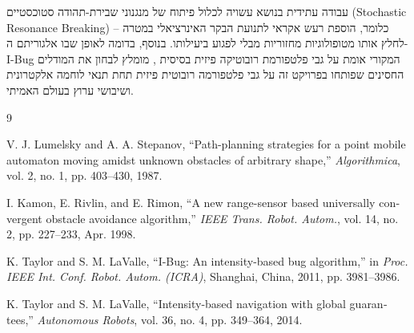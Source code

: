 \documentclass[12pt, a4paper]{article}
\begin{document}
עבודה עתידית בנושא עשויה לכלול פיתוח של מנגנוני שבירת-תהודה סטוכסטיים (\textenglish{Stochastic Resonance Breaking}) – כלומר, הוספת רעש אקראי לתנועת הבקר האינרציאלי במטרה לחלץ אותו מטופולוגיות מחזוריות מבלי לפגוע ביעילותו. בנוסף, בדומה לאופן שבו אלגוריתם ה-\textenglish{I-Bug} המקורי אומת על גבי פלטפורמת רובוטיקה פיזית בסיסית \cite{taylor2014intensity}, מומלץ לבחון את המודלים החסינים שפותחו בפרויקט זה על גבי פלטפורמה רובוטית פיזית תחת תנאי לוחמה אלקטרונית ושיבושי ערוץ בעולם האמיתי.
\newpage
\renewcommand{\refname}{רשימת מקורות}
\begin{thebibliography}{9}

\textenglish{V. J. Lumelsky and A. A. Stepanov, ``Path-planning strategies for a point mobile automaton moving amidst unknown obstacles of arbitrary shape,'' \textit{Algorithmica}, vol. 2, no. 1, pp. 403--430, 1987.}

\textenglish{I. Kamon, E. Rivlin, and E. Rimon, ``A new range-sensor based universally convergent obstacle avoidance algorithm,'' \textit{IEEE Trans. Robot. Autom.}, vol. 14, no. 2, pp. 227--233, Apr. 1998.}

\textenglish{K. Taylor and S. M. LaValle, ``I-Bug: An intensity-based bug algorithm,'' in \textit{Proc. IEEE Int. Conf. Robot. Autom. (ICRA)}, Shanghai, China, 2011, pp. 3981--3986.}

\textenglish{K. Taylor and S. M. LaValle, ``Intensity-based navigation with global guarantees,'' \textit{Autonomous Robots}, vol. 36, no. 4, pp. 349--364, 2014.}

\end{thebibliography}
\end{document}
